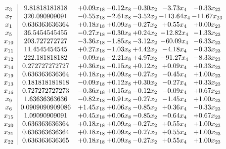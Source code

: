 \documentclass[8pt]{article}
\begin{document}
\[\begin{array}{c| c c@{\hskip 2pt} c@{\hskip 2pt} c@{\hskip 2pt} c@{\hskip 2pt} c@{\hskip 2pt} }
 x_{3}   &  9.81818181818 & +  0.09 x_{18} & -0.12 x_{8} & -0.30 x_{2} & -3.73 x_{4} & -0.33 x_{23}\\
 x_{7}   &  320.090909091 & -0.55 x_{18} & -2.61 x_{8} & -3.52 x_{2} & -113.64 x_{4} & -11.67 x_{23}\\
 x_{1}   &  0.636363636364 & +  0.18 x_{18} & +  0.09 x_{8} & -0.27 x_{2} & +  0.55 x_{4} & +  0.00 x_{23}\\
 x_{5}   &  36.5454545455 & -0.27 x_{18} & -0.30 x_{8} & +  0.24 x_{2} & -12.82 x_{4} & -1.33 x_{23}\\
 x_{10}   &  203.727272727 & -3.36 x_{18} & -1.85 x_{8} & -3.12 x_{2} & -60.09 x_{4} & -6.33 x_{23}\\
 x_{11}   &  11.4545454545 & +  0.27 x_{18} & -1.03 x_{8} & +  4.42 x_{2} & -4.18 x_{4} & -0.33 x_{23}\\
 x_{12}   &  222.181818182 & -0.09 x_{18} & -2.21 x_{8} & +  4.97 x_{2} & -91.27 x_{4} & -8.33 x_{23}\\
 x_{14}   &  0.272727272727 & +  0.36 x_{18} & -0.15 x_{8} & +  0.12 x_{2} & +  0.09 x_{4} & +  0.33 x_{23}\\
 x_{19}   &  0.636363636364 & +  0.18 x_{18} & +  0.09 x_{8} & -0.27 x_{2} & -0.45 x_{4} & +  1.00 x_{23}\\
 x_{13}   &  0.181818181818 & -0.09 x_{18} & +  0.12 x_{8} & +  0.30 x_{2} & -0.27 x_{4} & +  0.33 x_{23}\\
 x_{16}   &  0.727272727273 & -0.36 x_{18} & +  0.15 x_{8} & -0.12 x_{2} & -0.09 x_{4} & +  0.67 x_{23}\\
 x_{9}   &  1.63636363636 & -0.82 x_{18} & -0.91 x_{8} & -0.27 x_{2} & -1.45 x_{4} & +  1.00 x_{23}\\
 x_{6}   &  0.0909090909086 & +  1.45 x_{18} & +  0.06 x_{8} & -0.85 x_{2} & +  0.36 x_{4} & -0.33 x_{23}\\
 x_{15}   &  1.09090909091 & +  0.45 x_{18} & +  0.06 x_{8} & -0.85 x_{2} & -0.64 x_{4} & +  0.67 x_{23}\\
 x_{20}   &  0.636363636364 & +  0.18 x_{18} & +  0.09 x_{8} & -0.27 x_{2} & +  0.55 x_{4} & +  1.00 x_{23}\\
 x_{21}   &  0.636363636364 & +  0.18 x_{18} & +  0.09 x_{8} & -0.27 x_{2} & +  0.55 x_{4} & +  1.00 x_{23}\\
 x_{22}   &  0.636363636365 & +  0.18 x_{18} & +  0.09 x_{8} & -0.27 x_{2} & +  0.55 x_{4} & +  1.00 x_{23}\\

\end{array}\]
\end{document}
